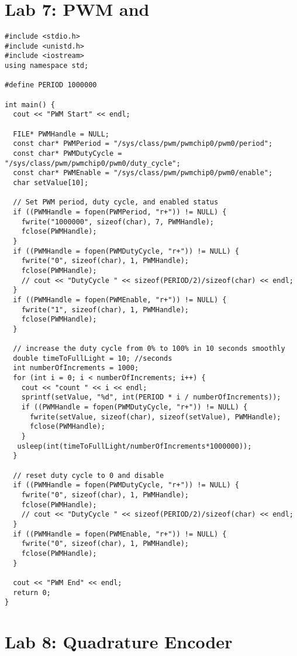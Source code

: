 \documentclass{article}
\let\Oldsection\section
\renewcommand{\section}{\FloatBarrier\Oldsection}
\def\CC{{C\nolinebreak[4]\hspace{-.05em}\raisebox{.4ex}{\tiny\bf ++}}}
\begin{document}
\section{Lab 7: PWM and \protect\CC}
\begin{lstlisting}[style=C++Style]
#include <stdio.h>
#include <unistd.h>
#include <iostream>
using namespace std;

#define PERIOD 1000000

int main() {
  cout << "PWM Start" << endl;

  FILE* PWMHandle = NULL;
  const char* PWMPeriod = "/sys/class/pwm/pwmchip0/pwm0/period";
  const char* PWMDutyCycle = "/sys/class/pwm/pwmchip0/pwm0/duty_cycle";
  const char* PWMEnable = "/sys/class/pwm/pwmchip0/pwm0/enable";
  char setValue[10];

  // Set PWM period, duty cycle, and enabled status
  if ((PWMHandle = fopen(PWMPeriod, "r+")) != NULL) {
    fwrite("1000000", sizeof(char), 7, PWMHandle);
    fclose(PWMHandle);
  }
  if ((PWMHandle = fopen(PWMDutyCycle, "r+")) != NULL) {
    fwrite("0", sizeof(char), 1, PWMHandle);
    fclose(PWMHandle);
    // cout << "DutyCycle " << sizeof(PERIOD/2)/sizeof(char) << endl;
  }
  if ((PWMHandle = fopen(PWMEnable, "r+")) != NULL) {
    fwrite("1", sizeof(char), 1, PWMHandle);
    fclose(PWMHandle);
  }

  // increase the duty cycle from 0% to 100% in 10 seconds smoothly
  double timeToFullLight = 10; //seconds
  int numberOfIncrements = 1000;
  for (int i = 0; i < numberOfIncrements; i++) {
    cout << "count " << i << endl;
    sprintf(setValue, "%d", int(PERIOD * i / numberOfIncrements));
    if ((PWMHandle = fopen(PWMDutyCycle, "r+")) != NULL) {
      fwrite(setValue, sizeof(char), sizeof(setValue), PWMHandle);
      fclose(PWMHandle);
    }
   usleep(int(timeToFullLight/numberOfIncrements*1000000));
  }

  // reset duty cycle to 0 and disable
  if ((PWMHandle = fopen(PWMDutyCycle, "r+")) != NULL) {
    fwrite("0", sizeof(char), 1, PWMHandle);
    fclose(PWMHandle);
    // cout << "DutyCycle " << sizeof(PERIOD/2)/sizeof(char) << endl;
  }
  if ((PWMHandle = fopen(PWMEnable, "r+")) != NULL) {
    fwrite("0", sizeof(char), 1, PWMHandle);
    fclose(PWMHandle);
  }

  cout << "PWM End" << endl;
  return 0;
}
\end{lstlisting}

\clearpage
\section{Lab 8: Quadrature Encoder}
\end{document}
